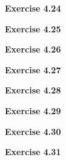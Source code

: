\documentclass{article}
\begin{document}
\bigskip

\begin{framed}
    \noindent \textbf{Exercise 4.24}
    
    \medskip
    
    
\end{framed}


\bigskip

\begin{framed}
    \noindent \textbf{Exercise 4.25}
    
    \medskip
    
    
\end{framed}


\bigskip

\begin{framed}
    \noindent \textbf{Exercise 4.26}
    
    \medskip
    
    
\end{framed}


\bigskip

\begin{framed}
    \noindent \textbf{Exercise 4.27}
    
    \medskip
    
    
\end{framed}


\bigskip

\begin{framed}
    \noindent \textbf{Exercise 4.28}
    
    \medskip
    
    
\end{framed}


\bigskip

\begin{framed}
    \noindent \textbf{Exercise 4.29}
    
    \medskip
    
    
\end{framed}


\bigskip

\begin{framed}
    \noindent \textbf{Exercise 4.30}
    
    \medskip
    
    
\end{framed}


\bigskip

\begin{framed}
    \noindent \textbf{Exercise 4.31}
    
    \medskip
    
    
\end{framed}
\end{document}
